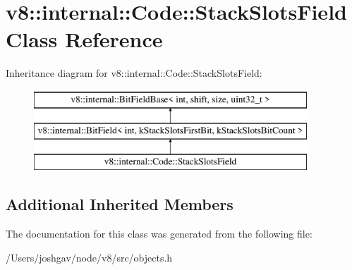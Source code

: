 \hypertarget{classv8_1_1internal_1_1_code_1_1_stack_slots_field}{}\section{v8\+:\+:internal\+:\+:Code\+:\+:Stack\+Slots\+Field Class Reference}
\label{classv8_1_1internal_1_1_code_1_1_stack_slots_field}
Inheritance diagram for v8\+:\+:internal\+:\+:Code\+:\+:Stack\+Slots\+Field\+:\begin{figure}[H]
\begin{center}
\leavevmode
\includegraphics[height=3.000000cm]{classv8_1_1internal_1_1_code_1_1_stack_slots_field}
\end{center}
\end{figure}
\subsection*{Additional Inherited Members}


The documentation for this class was generated from the following file\+:\begin{DoxyCompactItemize}
\item 
/\+Users/joshgav/node/v8/src/objects.\+h\end{DoxyCompactItemize}

